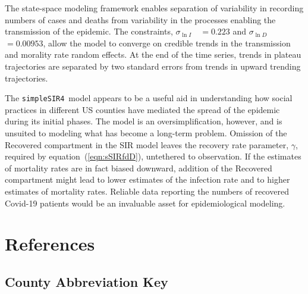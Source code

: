 \documentclass[12pt,letterpaper]{article}
\newcommand\SSm{{\tt simpleSIR4}}
\newcommand\slI{$\sigma_{\ln I}$\ }
\newcommand\slD{$\sigma_{\ln D}$}
\begin{document}
{The state-space modeling framework enables separation of variability in
recording numbers of cases and deaths from variability in the
processes enabling the transmission of the epidemic. 
The constraints, \slI~$ = 0.223$ and \slD~$= 0.00953$, allow the model
to converge on credible trends in the transmission and morality rate random
effects. At the end of the time series, trends in plateau trajectories
are separated by two standard errors from trends in upward trending
trajectories. 

The \SSm\ model appears to be a useful aid in
understanding how social practices in different US counties have
mediated the spread of the epidemic during its initial phases.
The model is an oversimplification, however, and is unsuited to modeling what
has become a long-term problem. Omission of the Recovered
compartment in the SIR model leaves the recovery rate parameter,
$\gamma$, required by equation~(\ref{eqn:sSIRfdD}), untethered to
observation. If the estimates of mortality rates are in fact biased
downward, addition of the Recovered compartment might lead to
lower estimates of the infection rate and to higher
estimates of mortality rates.
Reliable data reporting the numbers of recovered
Covid-19 patients would be an invaluable asset for epidemiological
modeling.


\clearpage
\section*{References}
\printbibliography[heading=none]
\clearpage

\appendixpage
\begin{appendices}


\section{County Abbreviation Key}


\end{appendices}}
\end{document}

